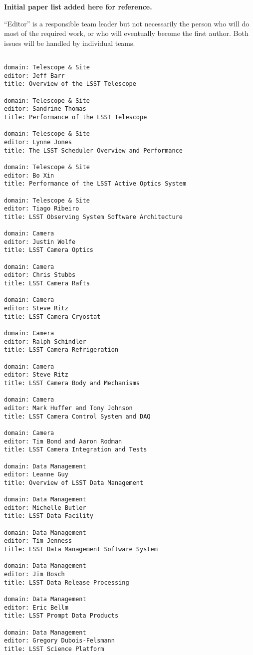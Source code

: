\appendix{}

{\bf Initial paper list added here for reference.}  

``Editor'' is a responsible team leader but not necessarily the person who will do most of 
the required work, or who will eventually become the first author. Both issues will be 
handled by individual teams. 

\begin{verbatim}

domain: Telescope & Site
editor: Jeff Barr
title: Overview of the LSST Telescope

domain: Telescope & Site
editor: Sandrine Thomas 
title: Performance of the LSST Telescope

domain: Telescope & Site
editor: Lynne Jones
title: The LSST Scheduler Overview and Performance 

domain: Telescope & Site
editor: Bo Xin
title: Performance of the LSST Active Optics System  

domain: Telescope & Site
editor: Tiago Ribeiro
title: LSST Observing System Software Architecture

domain: Camera 
editor: Justin Wolfe 
title: LSST Camera Optics 

domain: Camera 
editor: Chris Stubbs 
title: LSST Camera Rafts 

domain: Camera 
editor: Steve Ritz 
title: LSST Camera Cryostat

domain: Camera 
editor: Ralph Schindler 
title: LSST Camera Refrigeration

domain: Camera 
editor: Steve Ritz  
title: LSST Camera Body and Mechanisms 

domain: Camera 
editor: Mark Huffer and Tony Johnson
title: LSST Camera Control System and DAQ 

domain: Camera 
editor: Tim Bond and Aaron Rodman 
title: LSST Camera Integration and Tests 

domain: Data Management 
editor: Leanne Guy 
title: Overview of LSST Data Management

domain: Data Management 
editor: Michelle Butler 
title: LSST Data Facility

domain: Data Management 
editor: Tim Jenness
title: LSST Data Management Software System

domain: Data Management 
editor: Jim Bosch 
title: LSST Data Release Processing

domain: Data Management 
editor: Eric Bellm 
title: LSST Prompt Data Products

domain: Data Management 
editor: Gregory Dubois-Felsmann
title: LSST Science Platform


\end{verbatim}
